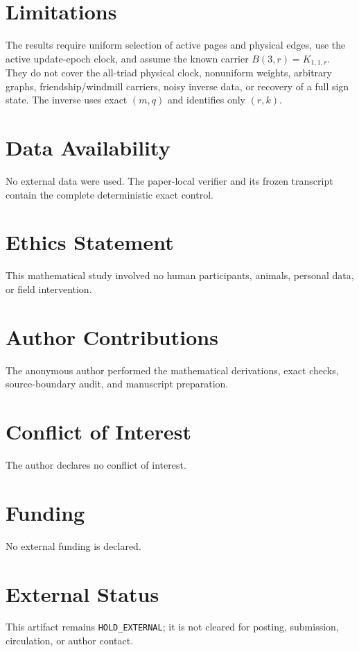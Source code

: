\documentclass[a4paper,10pt]{amsart}
\theoremstyle{remark}
\begin{document}
\section*{Limitations}
The results require uniform selection of active pages and physical edges,
use the active update-epoch clock, and assume the known carrier
$B(3,r)=K_{1,1,r}$.  They do not cover the all-triad physical clock,
nonuniform weights, arbitrary graphs, friendship/windmill carriers, noisy
inverse data, or recovery of a full sign state.  The inverse uses exact
$(m,q)$ and identifies only $(r,k)$.

\section*{Data Availability}
No external data were used.  The paper-local verifier and its frozen
transcript contain the complete deterministic exact control.

\section*{Ethics Statement}
This mathematical study involved no human participants, animals, personal
data, or field intervention.

\section*{Author Contributions}
The anonymous author performed the mathematical derivations, exact checks,
source-boundary audit, and manuscript preparation.

\section*{Conflict of Interest}
The author declares no conflict of interest.

\section*{Funding}
No external funding is declared.

\section*{External Status}
This artifact remains \texttt{HOLD\_EXTERNAL}; it is not cleared for posting,
submission, circulation, or author contact.



\end{document}
